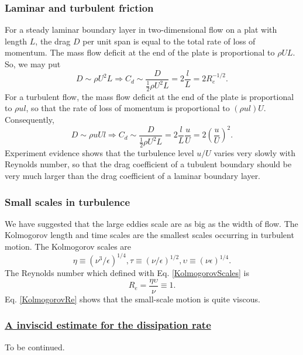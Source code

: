 \documentclass[review]{elsarticle}
\numberwithin{equation}{section}
\begin{document}
		\subsubsection{Laminar and turbulent friction}
			For a steady laminar boundary layer in two-dimensional flow on a plat with length $L$, the drag $D$ per unit span 
			is equal to the total rate of loss of momentum. The mass flow deficit at the end of the plate is proportional to 
			$\rho UL$. So, we may put 
			\begin{equation} 
				D \sim \rho U^2L \Rightarrow C_d \sim \frac{D}{\frac{1}{2}\rho U^2L}=2\frac{l}{L}=2R_e^{-1/2}.
			\end{equation} 
			For a turbulent flow, the mass flow deficit at the end of the plate is proportional to $\rho ul$, so that the rate of 
			loss of momentum is proportional to $(\rho ul)U$. Consequently,
			\begin{equation}
				D \sim \rho uUl \Rightarrow C_d \sim \frac{D}{\frac{1}{2}\rho U^2L}=2\frac{l}{L}\frac{u}{U}=2\left( \frac{u}{U}\right)^2.
			\end{equation}	 
			Experiment evidence shows that the turbulence level $u/U$ varies very slowly with Reynolds number, so that the drag 
			coefficient of a tubulent boundary should be very much larger than the drag coefficient of a laminar boundary layer.
		\subsubsection{Small scales in turbulence}
			We have suggested that the large eddies scale are as big as the width of flow. The Kolmogorov length and time scales 
			are the smallest scales occurring in turbulent motion. The Kolmogorov scales are
			\begin{equation}\label{KolmogorovScales}
				\eta \equiv \left( \nu ^3 / \epsilon \right)^{1/4}, \tau \equiv \left( \nu / \epsilon \right)^{1/2},
				\upsilon \equiv \left( \nu \epsilon \right)^{1/4}.
			\end{equation}
			The Reynolds number which defined with Eq. \ref{KolmogorovScales} is
			\begin{equation}\label{KolmogorovRe}
				R_e = \frac{\eta\upsilon}{\nu} \equiv 1.
			\end{equation}
			Eq. \ref{KolmogorovRe} shows that the small-scale motion is quite viscous.
	 
			
		\subsubsection{\underline{A inviscid estimate for the dissipation rate}}
			To be continued.
\end{document}
